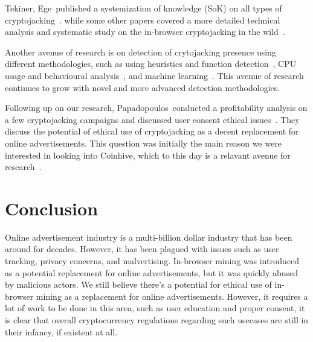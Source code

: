 Tekiner, Ege~\etal published a systemization of knowledge (SoK) on all types of cryptojacking~\cite{tekiner2021sok}. while some other papers covered a more detailed technical analysis and systematic study on the in-browser cryptojacking in the wild~\cite{hong2018you,ruth2018digging,bijmans2019inadvertently,musch2019thieves,musch2018web,saad2018end}.

Another avenue of research is on detection of crytojacking presence using different methodologies, such as using heuristics and function detection~\cite{kharraz2019outguard,konoth2018minesweeper}, CPU usage and behavioural analysis~\cite{gomes2020cryptojacking,ning2019capjack,rodriguez2018rapid,tanana2020behavior}, and machine learning~\cite{naseem2021minos,caprolu2021cryptomining,liu2018novel,petrov2020coinpolice}. This avenue of research continues to grow with novel and more advanced detection methodologies.

Following up on our research, Papadopoulos~\etal conducted a profitability analysis on a few cryptojacking campaigns and discussed user consent ethical issues~\cite{papadopoulos2018truth}. They discuss the potential of ethical use of cryptojacking as a decent replacement for online advertisements. This question was initially the main reason we were interested in looking into Coinhive, which to this day is a relavant avenue for research~\cite{yayla2023mining}.



\section{Conclusion}
Online advertisement industry is a multi-billion dollar industry that has been around for decades. However, it has been plagued with issues such as user tracking, privacy concerns, and malvertising. In-browser mining was introduced as a potential replacement for online advertisements, but it was quickly abused by malicious actors. We still believe there's a potential for ethical use of in-browser mining as a replacement for online advertisements. 
However, it requires a lot of work to be done in this area, such as user education and proper consent, it is clear that overall cryptocurrency regulations regarding such usecases are still in their infancy, if existent at all.







